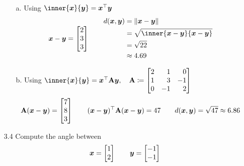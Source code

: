 \documentclass[11pt]{article}
\begin{document}
\begin{enumerate}
          \begin{enumerate}
              \item[a.] Using $\inner{\x}{\y} = \x^\top \y$
                    \[
                        \x - \y =
                        \begin{bmatrix}
                            2 \\ 3 \\ 3
                        \end{bmatrix}
                        \qquad
                        \begin{aligned}
                            d(\x, \y) & = \norm{ \x - \y }                    \\
                                      & = \sqrt{\inner{ \x - \y }{ \x - \y }} \\
                                      & = \sqrt{22}                           \\
                                      & \approx 4.69
                        \end{aligned}
                    \]

              \item[b.] Using $\inner{\x}{\y} = \x^\top \mat{A} \y, \quad \mat{A} \coloneq
                        \begin{bmatrix*}[r]
                            2 & 1  & 0  \\
                            1 & 3  & -1 \\
                            0 & -1 & 2  \\
                        \end{bmatrix*}
                    $
                    \[
                        \mathbf{A} (\boldsymbol{x} - \boldsymbol{y}) =
                        \begin{bmatrix}
                            7 \\ 8 \\ 3
                        \end{bmatrix}
                        \qquad
                        (\boldsymbol{x} - \boldsymbol{y})^\top \mathbf{A} (\boldsymbol{x} - \boldsymbol{y}) = 47
                        \qquad
                        d(\boldsymbol{x}, \boldsymbol{y}) = \sqrt{47} \approx 6.86
                    \]

          \end{enumerate}

    \item[3.4] Compute the angle between
          \[
              \boldsymbol{x} =
              \begin{bmatrix}
                  1 \\ 2
              \end{bmatrix}
              \qquad
              \boldsymbol{y} =
              \begin{bmatrix}
                  -1 \\ -1
              \end{bmatrix}
          \]


\end{enumerate}
\end{document}
